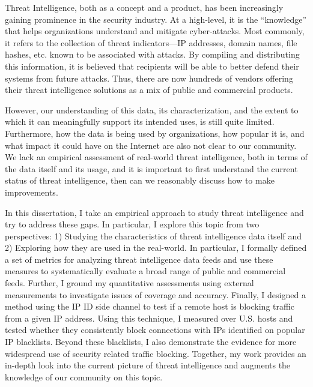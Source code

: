 \begin{dissertationabstract}

Threat Intelligence, both as a concept and a product, has been increasingly
gaining prominence in the security industry. At a high-level, it is the 
``knowledge'' that helps organizations understand and mitigate cyber-attacks.
Most commonly, it refers to the collection of threat indicators---IP 
addresses, domain names, file hashes, etc. known to be associated with 
attacks. By compiling and distributing this information, it is believed 
that recipients will be able to better 
defend their systems from future attacks. Thus, there are now hundreds of
vendors offering their threat intelligence solutions as a mix of public and
commercial products. 

However, our understanding of this data, its characterization, and the
extent to which it can meaningfully support its intended uses, is
still quite limited. Furthermore, how the data is being used by
organizations, how popular it is, and what impact it could have on the 
Internet are also not clear to our community. We lack an empirical 
assessment of real-world threat intelligence, both in terms of the data
itself and its usage, and it is important to first understand the current 
status of threat intelligence, then can we reasonably discuss how to make
improvements.

In this dissertation, I take an empirical approach to study threat 
intelligence and try to address these gaps. In particular, I explore 
this topic from two perspectives: 1) Studying the characteristics of 
threat intelligence data itself and 2) Exploring how they are used in the 
real-world. In particular, I formally defined a set of metrics for 
analyzing threat intelligence data feeds and use these measures to 
systematically evaluate a broad range of public and commercial feeds. 
Further, I ground my quantitative assessments using external measurements 
to investigate issues of coverage and accuracy. Finally, I
designed a method using the IP ID side channel to test if a remote host 
is blocking traffic from a given IP address. Using this technique, I 
measured over {} U.S. hosts and tested whether they 
consistently block connections with IPs identified on popular IP blacklists. 
Beyond these blacklists, I also demonstrate the evidence for more widespread 
use of security related traffic blocking. Together, my work provides
an in-depth look into the current picture of threat intelligence and augments
the knowledge of our community on this topic.

\end{dissertationabstract}
